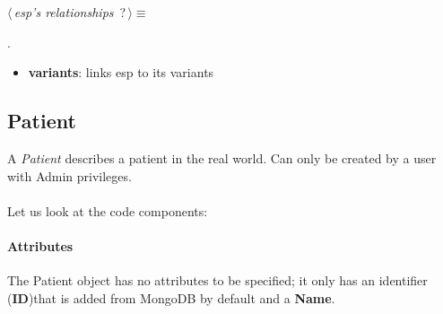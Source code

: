 	\begin{flushleft} \small
\begin{minipage}{\linewidth}\label{scrap15}\raggedright\small
{} $\langle\,${\itshape {esp's relationships}}\nobreak\ {\footnotesize {?}}$\,\rangle\equiv$
\vspace{-1ex}
\begin{list}{}{} \item

                
        {\NWsep}
\end{list}
\vspace{-1.5ex}
\footnotesize
\begin{list}{}{\setlength{\itemsep}{-\parsep}\setlength{\itemindent}{-\leftmargin}}
\item {\NWtxtMacroNoRef}.

\item{}
\end{list}
\end{minipage}\vspace{4ex}
\end{flushleft}
\begin{itemize}
 	\item \textbf{variants}: links esp to its variants
\end{itemize}


\subsection{Patient}
A \emph{Patient} describes a patient in the real world. Can only be created by a user with Admin privileges.
\\
\\Let us look at the code components:

\paragraph{Attributes}      

The Patient object has no attributes to be specified; it only has an identifier (\textbf{ID})that is added from MongoDB by default and a \textbf{Name}.

